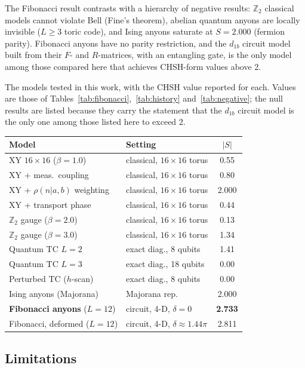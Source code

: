 \documentclass[aps,pra,twocolumn,superscriptaddress,showpacs,floatfix]{revtex4-2}
\newcommand{\Ztwo}{\mathbb{Z}_2}
\begin{document}
The Fibonacci result contrasts with a hierarchy of negative results: $\Ztwo$ classical
models cannot violate Bell (Fine's theorem), abelian quantum anyons are locally
invisible ($L \geq 3$ toric code), and Ising anyons saturate at $S = 2.000$
(fermion parity). Fibonacci anyons have no parity restriction, and the
$d_{1b}$ circuit model built from their $F$- and $R$-matrices, with an
entangling gate, is the only model among those compared here that achieves
CHSH-form values above 2.

\smallskip
\noindent The models tested in this work, with the CHSH value reported for
each. Values are those of Tables~\ref{tab:fibonacci},~\ref{tab:history}
and~\ref{tab:negative}; the null results are listed because they carry the
statement that the $d_{1b}$ circuit model is the only one among those listed
here to exceed 2.
\smallskip
\begin{ruledtabular}
\footnotesize
\begin{tabular}{l l c}
Model & Setting & $|S|$ \\
\hline
XY $16{\times}16$ ($\beta{=}1.0$) & classical, $16{\times}16$ torus & 0.55 \\
XY + meas.\ coupling & classical, $16{\times}16$ torus & 0.80 \\
XY + $\rho(n|a,b)$ weighting & classical, $16{\times}16$ torus & 2.000 \\
XY + transport phase & classical, $16{\times}16$ torus & 0.44 \\
$\Ztwo$ gauge ($\beta{=}2.0$) & classical, $16{\times}16$ torus & 0.13 \\
$\Ztwo$ gauge ($\beta{=}3.0$) & classical, $16{\times}16$ torus & 1.34 \\
Quantum TC $L{=}2$ & exact diag., 8 qubits & 1.41 \\
Quantum TC $L{=}3$ & exact diag., 18 qubits & 0.00 \\
Perturbed TC ($h$-scan) & exact diag., 8 qubits & 0.00 \\
Ising anyons (Majorana) & Majorana rep. & 2.000 \\
\textbf{Fibonacci anyons} ($L{=}12$) & circuit, 4-D, $\delta{=}0$ & \textbf{2.733} \\
Fibonacci, deformed ($L{=}12$) & circuit, 4-D, $\delta{\approx}1.44\pi$ & 2.811 \\
\end{tabular}
\end{ruledtabular}

\subsection{Limitations}
\end{document}
